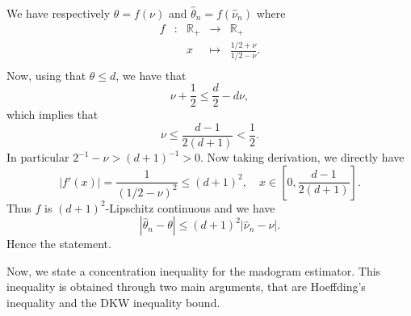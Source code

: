 \documentclass[11pt]{article}
\makeatletter
\theoremstyle{definition}
\renewenvironment{proof}[1][\proofname]{\par
\pushQED{\qed}%
\normalfont \topsep6\p@\@plus6\p@\relax
\trivlist
\item\relax
{\textbf{
#1\@addpunct{ }}}\hspace\labelsep\ignorespaces
}{%
\popQED\endtrivlist\@endpefalse
}
\makeatother
\begin{document}
	\begin{proof}
		We have respectively $\theta = f(\nu)$ and $\hat{\theta}_n = f(\hat{\nu}_n)$ where
		\begin{equation*}
			\begin{array}{ccccc}
f & : & \mathbb{R}_+ & \to & \mathbb{R}_+ \\
 & & x & \mapsto & \frac{1/2 + \nu}{1/2 - \nu}. \\
			\end{array}
		\end{equation*}
		Now, using that $\theta \leq d$, we have that
		\begin{equation*}
			\nu + \frac{1}{2} \leq \frac{d}{2} - d \nu,
		\end{equation*}
		which implies that
		\begin{equation*}
			\nu \leq \frac{d-1}{2(d+1)} < \frac{1}{2}.
		\end{equation*}
		In particular $2^{-1} - \nu > (d+1)^{-1} > 0$. Now taking derivation, we directly have
		\begin{equation*}
			|f'(x)| = \frac{1}{(1/2 - \nu)^2} \leq (d+1)^2, \quad x \in \left[0, \frac{d-1}{2(d+1)}\right].
		\end{equation*}
		Thus $f$ is $(d+1)^2$-Lipschitz continuous and we have
		\begin{equation*}
			|\hat{\theta}_n - \theta| \leq (d+1)^2 |\hat{\nu}_n - \nu|.
		\end{equation*}
		Hence the statement.
	\end{proof}
	
	Now, we state a concentration inequality for the madogram estimator. This inequality is obtained through two main arguments, that are Hoeffding's inequality and the DKW inequality bound.
	
\end{document}
